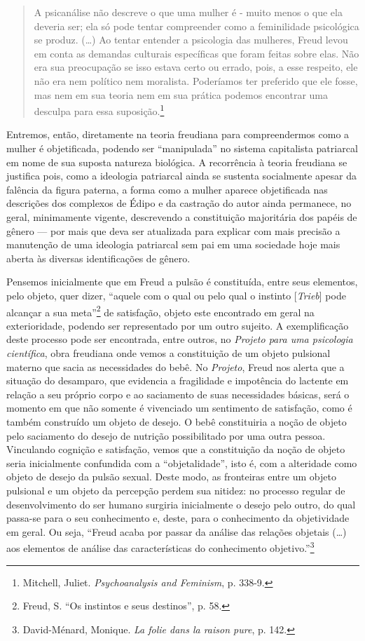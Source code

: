 \begin{quote}
A psicanálise não descreve o que uma mulher é - muito menos o que ela
deveria ser; ela só pode tentar compreender como a feminilidade
psicológica se produz. (\ldots{}) Ao tentar entender a psicologia das
mulheres, Freud levou em conta as demandas culturais específicas que
foram feitas sobre elas. Não era sua preocupação se isso estava certo ou
errado, pois, a esse respeito, ele não era nem político nem moralista.
Poderíamos ter preferido que ele fosse, mas nem em sua teoria nem em sua
prática podemos encontrar uma desculpa para essa suposição.\footnote{Mitchell,
  Juliet. \emph{Psychoanalysis and Feminism}, p. 338-9.}
\end{quote}

Entremos, então, diretamente na teoria freudiana para compreendermos
como a mulher é objetificada, podendo ser ``manipulada'' no sistema
capitalista patriarcal em nome de sua suposta natureza biológica. A
recorrência à teoria freudiana se justifica pois, como a ideologia
patriarcal ainda se sustenta socialmente apesar da falência da figura
paterna, a forma como a mulher aparece objetificada nas descrições dos
complexos de Édipo e da castração do autor ainda permanece, no geral,
minimamente vigente, descrevendo a constituição majoritária dos papéis
de gênero --- por mais que deva ser atualizada para explicar com mais
precisão a manutenção de uma ideologia patriarcal sem pai em uma
sociedade hoje mais aberta às diversas identificações de gênero.

Pensemos inicialmente que em Freud a pulsão é constituída, entre seus
elementos, pelo objeto, quer dizer, ``aquele com o qual ou pelo qual o
instinto {[}\emph{Trieb}{]} pode alcançar a sua meta''\footnote{Freud,
  S. ``Os instintos e seus destinos'', p. 58.} de
satisfação, objeto este encontrado em geral na exterioridade, podendo
ser representado por um outro sujeito. A exemplificação deste processo
pode ser encontrada, entre outros, no \emph{Projeto para uma psicologia
científica}, obra freudiana onde vemos a constituição de um objeto
pulsional materno que sacia as necessidades do bebê. No \emph{Projeto},
Freud nos alerta que a situação do desamparo, que evidencia a
fragilidade e impotência do lactente em relação a seu próprio corpo e ao
saciamento de suas necessidades básicas, será o momento em que não
somente é vivenciado um sentimento de satisfação, como é também
construído um objeto de desejo. O bebê constituiria a noção de objeto
pelo saciamento do desejo de nutrição possibilitado por uma outra
pessoa. Vinculando cognição e satisfação, vemos que a constituição da
noção de objeto seria inicialmente confundida com a ``objetalidade'',
isto é, com a alteridade como objeto de desejo da pulsão sexual. Deste
modo, as fronteiras entre um objeto pulsional e um objeto da percepção
perdem sua nitidez: no processo regular de desenvolvimento do ser humano
surgiria inicialmente o desejo pelo outro, do qual passa-se para o seu
conhecimento e, deste, para o conhecimento da objetividade em geral. Ou
seja, ``Freud acaba por passar da análise das relações objetais (\ldots{})
aos elementos de análise das características do conhecimento
objetivo.''\footnote{David-Ménard, Monique. \emph{La
  folie dans la raison pure}, p. 142.}

